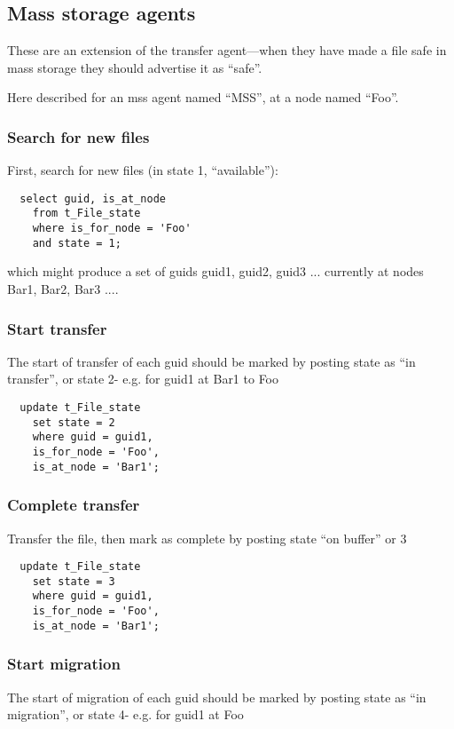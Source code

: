 \documentclass{cmspaper}
\begin{document}
\subsection{Mass storage agents}
These are an extension of the transfer agent---when they have made a
file safe in mass storage they should advertise it as ``safe''.

Here described for an mss agent named ``MSS'', at a node named ``Foo''.

\subsubsection{Search for new files}
First, search for new files (in state 1, ``available''):

{\small\begin{verbatim}
  select guid, is_at_node
    from t_File_state
    where is_for_node = 'Foo'
    and state = 1;
\end{verbatim}}

which might produce a set of guids {guid1, guid2, guid3 ...} currently at nodes {Bar1, Bar2, Bar3 ...}. 

\subsubsection{Start transfer}
The start of transfer of each guid should be marked by posting state as ``in transfer'', or state 2- e.g. for guid1 at Bar1 to Foo

{\small\begin{verbatim}
  update t_File_state
    set state = 2
    where guid = guid1,
    is_for_node = 'Foo',
    is_at_node = 'Bar1';
  \end{verbatim}}

\subsubsection{Complete transfer}
Transfer the file, then mark as complete by posting state ``on buffer'' or 3

{\small\begin{verbatim}
  update t_File_state
    set state = 3
    where guid = guid1,
    is_for_node = 'Foo',
    is_at_node = 'Bar1';
\end{verbatim}}

\subsubsection{Start migration}
The start of migration of each guid should be marked by posting state as ``in migration'', or state 4- e.g. for guid1 at Foo
\end{document}
